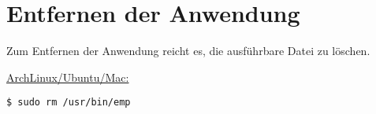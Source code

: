 
\section{Entfernen der Anwendung}

Zum Entfernen der Anwendung reicht es, die ausführbare Datei zu löschen.

\underline{ArchLinux/Ubuntu/Mac:}
\begin{lstlisting}[style=Bash]
$ sudo rm /usr/bin/emp
\end{lstlisting}